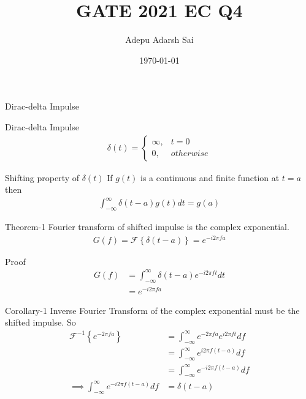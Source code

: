 \documentclass{beamer}
\title{GATE 2021 EC Q4}
\author{Adepu Adarsh Sai}
\institute{IITH(AI)}
\date{\today}
\providecommand{\brak}[1]{\ensuremath{\left(#1\right)}}
\providecommand{\cbrak}[1]{\ensuremath{\left\{#1\right\}}}
\begin{document}
\begin{frame}
\titlepage
\end{frame}
\begin{frame}{Dirac-delta Impulse}
    \begin{block}{Dirac-delta Impulse}
    \begin{align}
 \delta\brak{t}=
 \begin{cases}
 \infty , & t=0\\
 0, & otherwise
 \end{cases}
\end{align}
    \end{block}
\begin{block}{Shifting property of $\delta\brak{t}$}
If $g\brak{t}$ is a continuous and finite function at $t=a$ then
 \begin{align}
     \int_{-\infty}^{\infty}\delta\brak{t-a}g\brak{t}dt=g\brak{a}
 \end{align}
\end{block}
\end{frame}
\begin{frame}{}
    \begin{block}{Theorem-1}
      Fourier transform of shifted impulse is the complex exponential.
\begin{align}
    G\brak{f}=\mathcal{F}\cbrak{\delta\brak{t-a}}=e^{-i2\pi fa}
\end{align}
    \end{block}
    \begin{block}{Proof}
      \begin{align}
     G\brak{f}&=\int_{-\infty}^{\infty}\delta\brak{t-a}e^{-i2\pi ft}dt\\
     &=e^{-i2\pi fa}
 \end{align}
    \end{block}
\end{frame}
\begin{frame}
     \begin{block}{Corollary-1}
      Inverse Fourier Transform of the complex exponential must be the shifted impulse. So
\begin{align}
    \mathcal{F}^{-1}\cbrak{e^{-2\pi fa}}&=\int_{-\infty}^{\infty}e^{-2\pi fa}e^{i2\pi ft}df\\
    &=\int_{-\infty}^{\infty}e^{i2\pi f\brak{t-a}}df\\
    &=\int_{-\infty}^{\infty}e^{-i2\pi f\brak{t-a}}df\\
    \implies \int_{-\infty}^{\infty}e^{-i2\pi f\brak{t-a}}df &=\delta\brak{t-a}
\end{align}
    \end{block}
\end{frame}
\end{document}
